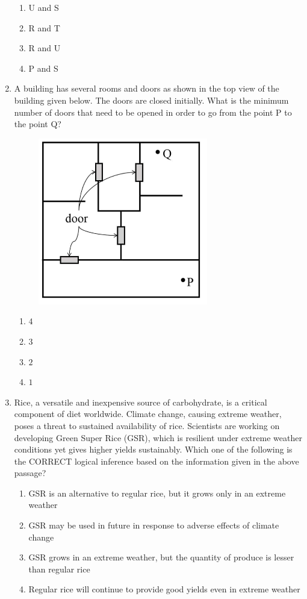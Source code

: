 \documentclass[journal]{IEEEtran}
\begin{document}
\begin{enumerate}[start=1]
\hfill{}
\begin{enumerate}
\item U and S
\item R and T
\item R and U
\item P and S
\end{enumerate}

\item A building has several rooms and doors as shown in the top view of the building given below. The doors are closed initially. What is the minimum number of doors that need to be opened in order to go from the point P to the point Q?

\hfill{}
\begin{figure}[H]
\centering
\includegraphics[width = 0.42\columnwidth]{figs/01.png}
\caption*{}
\label{fig:q5}
\end{figure}
\begin{enumerate}
\item $4$
\item $3$
\item $2$
\item $1$
\end{enumerate}

\item Rice, a versatile and inexpensive source of carbohydrate, is a critical component of diet worldwide. Climate change, causing extreme weather, poses a threat to sustained availability of rice. Scientists are working on developing Green Super Rice (GSR), which is resilient under extreme weather conditions yet gives higher yields sustainably. Which one of the following is the CORRECT logical inference based on the information given in the above passage?

\hfill{}
\begin{enumerate}
\item GSR is an alternative to regular rice, but it grows only in an extreme weather
\item GSR may be used in future in response to adverse effects of climate change
\item GSR grows in an extreme weather, but the quantity of produce is lesser than regular rice
\item Regular rice will continue to provide good yields even in extreme weather
\end{enumerate}


\end{enumerate}
\end{document}
